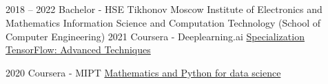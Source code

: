 \documentclass[9pt]{developercv} %
\begin{document}
	\begin{minipage}[t]{0.4\textwidth} %
		\vspace{-\baselineskip} %
		
		
		\\	
		\\
		
	\end{minipage}
	\begin{minipage}[t]{0.5\textwidth} %
		\vspace{-\baselineskip} %
		
		\\
		\\
		
		
	\end{minipage}
	
	\vspace{0.5cm}
	
	
	


\begin{entrylist}
	\entry
	{2018 -- 2022}
	{Bachelor - HSE Tikhonov Moscow Institute of Electronics and Mathematics}
	{ }
	{Information Science and Computation Technology (School of Computer Engineering)}
	\entry
	{2021}
	{Coursera - Deeplearning.ai}
	{ }
	{\href{https://coursera.org/share/1d45e9d0ba15647e611293d3955245dc}{Specialization TensorFlow: Advanced Techniques}}
	
	\entry
	{2020}
	{Coursera - MIPT}
	{ }
	{\href{https://coursera.org/share/bafe4bd915f06b8a8dce179ffabdbd22}{Mathematics and Python for data science}}
	
\end{entrylist}
	
\end{document}
